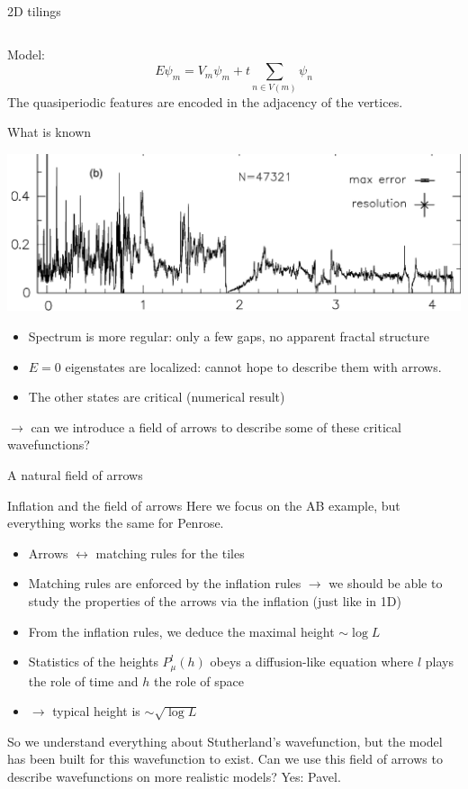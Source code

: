 \documentclass[xcolor=x11names,compress,professionalfonts]{beamer}
\renewcommand{\(}{\begin{columns}}
\renewcommand{\)}{\end{columns}}
\newcommand{\<}[1]{\begin{column}{#1}}
\renewcommand{\>}{\end{column}}
\begin{document}
\begin{frame}{2D tilings}
\begin{columns}
\begin{column}{5cm}
{}
\end{column}
\end{columns}
Model:
\[
	E \psi_m = V_m \psi_m + t\sum_{n \in V(m)} \psi_n
\]
The quasiperiodic features are encoded in the adjacency of the vertices.
\end{frame}

\begin{frame}{What is known}

{\centering
\includegraphics[scale=.1]{img/idos_AB_small.png}

}
\begin{itemize}
	\item Spectrum is more regular: only a few gaps, no apparent fractal structure
	\item $E = 0$ eigenstates are localized: cannot hope to describe them with arrows.
	\item The other states are critical (numerical result)
\end{itemize}
$\rightarrow$ can we introduce a field of arrows to describe some of these critical wavefunctions?
\end{frame}

\begin{frame}{A natural field of arrows}

\end{frame}

\begin{frame}{Inflation and the field of arrows}
Here we focus on the AB example, but everything works the same for Penrose.
\begin{itemize}
	\item Arrows $\leftrightarrow$ matching rules for the tiles 
	\item Matching rules are enforced by the inflation rules $\rightarrow$ we should be able to study the properties of the arrows via the inflation (just like in 1D)
	\item From the inflation rules, we deduce the maximal height $\sim \log L$
	\item Statistics of the heights $P_\mu^{l}(h)$ obeys a diffusion-like equation where $l$ plays the role of time and $h$ the role of space
	\item $\rightarrow$ typical height is $\sim \sqrt{\log L}$
\end{itemize}
So we understand everything about Stutherland's wavefunction, but the model has been built for this wavefunction to exist. 
Can we use this field of arrows to describe wavefunctions on more realistic models?
Yes: Pavel.
\end{frame}
\end{document}
